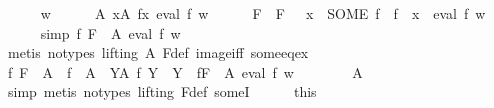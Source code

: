 \begin{isabellebody}
\ \ \ \ \isamarkupfalse%
\ w\isanewline
\ \ \ \ \isamarkupfalse%
\ A{\isacharcolon}{\kern0pt}\ {\isachardoublequoteopen}{\isasymforall}x{\isasymin}A{\isachardot}{\kern0pt}\ {\isasymexists}f{\isasymin}x{\isachardot}{\kern0pt}\ eval\ f\ w{\isachardoublequoteclose}\isanewline
\ \ \ \ \isamarkupfalse%
\ F\ \ {\isachardoublequoteopen}F\ {\isacharequal}{\kern0pt}\ {\isacharparenleft}{\kern0pt}{\isasymlambda}\ x\ {\isachardot}{\kern0pt}\ SOME\ f\ {\isachardot}{\kern0pt}\ f\ {\isasymin}\ x\ {\isasymand}\ eval\ f\ w{\isacharparenright}{\kern0pt}{\isachardoublequoteclose}\isanewline
\ \ \ \ \isamarkupfalse%
\ {\isacharbrackleft}{\kern0pt}simp{\isacharbrackright}{\kern0pt}{\isacharcolon}{\kern0pt}\ {\isachardoublequoteopen}{\isacharparenleft}{\kern0pt}{\isasymforall}f{\isasymin}\ {\isacharparenleft}{\kern0pt}F\ {\isacharbackquote}{\kern0pt}\ A{\isacharparenright}{\kern0pt}{\isachardot}{\kern0pt}\ eval\ f\ w{\isacharparenright}{\kern0pt}{\isachardoublequoteclose}\isanewline
\ \ \ \ \ \ \isamarkupfalse%
\ {\isacharparenleft}{\kern0pt}metis\ {\isacharparenleft}{\kern0pt}no{\isacharunderscore}{\kern0pt}types{\isacharcomma}{\kern0pt}\ lifting{\isacharparenright}{\kern0pt}\ A\ F{\isacharunderscore}{\kern0pt}def\ image{\isacharunderscore}{\kern0pt}iff\ some{\isacharunderscore}{\kern0pt}eq{\isacharunderscore}{\kern0pt}ex{\isacharparenright}{\kern0pt}\isanewline
\ \ \ \ \isamarkupfalse%
\ {\isachardoublequoteopen}{\isacharparenleft}{\kern0pt}{\isasymexists}f{\isachardot}{\kern0pt}\ F\ {\isacharbackquote}{\kern0pt}\ A\ {\isacharequal}{\kern0pt}\ f\ {\isacharbackquote}{\kern0pt}\ A\ {\isasymand}\ {\isacharparenleft}{\kern0pt}{\isasymforall}Y{\isasymin}A{\isachardot}{\kern0pt}\ f\ Y\ {\isasymin}\ Y{\isacharparenright}{\kern0pt}{\isacharparenright}{\kern0pt}\ {\isasymand}\ {\isacharparenleft}{\kern0pt}{\isasymforall}f{\isasymin}{\isacharparenleft}{\kern0pt}F\ {\isacharbackquote}{\kern0pt}\ A{\isacharparenright}{\kern0pt}{\isachardot}{\kern0pt}\ eval\ f\ w{\isacharparenright}{\kern0pt}{\isachardoublequoteclose}\isanewline
\ \ \ \ \ \ \isamarkupfalse%
\ A\ \isamarkupfalse%
\ {\isacharparenleft}{\kern0pt}simp{\isacharcomma}{\kern0pt}\ metis\ {\isacharparenleft}{\kern0pt}no{\isacharunderscore}{\kern0pt}types{\isacharcomma}{\kern0pt}\ lifting{\isacharparenright}{\kern0pt}\ F{\isacharunderscore}{\kern0pt}def\ someI{\isacharparenright}{\kern0pt}{\isacharplus}{\kern0pt}\isanewline
\ \ \ \ \isamarkupfalse%
\ this\ \isamarkupfalse%

\end{isabellebody}
